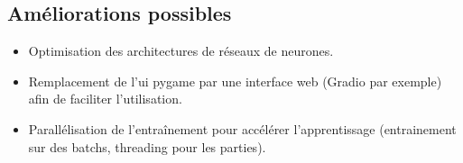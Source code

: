 \documentclass[]{article}
\begin{document}
\subsection{Améliorations possibles}
\begin{itemize}
  \item Optimisation des architectures de réseaux de neurones.
  \item Remplacement de l'ui pygame par une interface web (Gradio par exemple) afin de faciliter l'utilisation.
  \item Parallélisation de l'entraînement pour accélérer l'apprentissage (entrainement sur des batchs, threading pour les parties).
\end{itemize}
\end{document}
